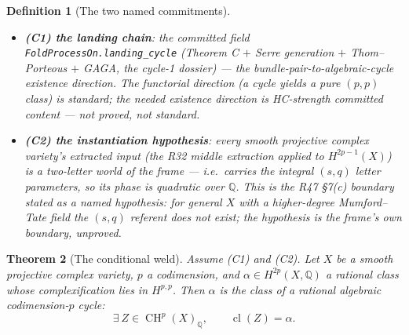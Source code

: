 \documentclass[11pt]{article}
\newcommand{\Q}{\mathbb Q}
\newcommand{\Cl}{\operatorname{cl}}
\newcommand{\CH}{\operatorname{CH}}
\newtheorem{theorem}{Theorem}[section]
\newtheorem{definition}[theorem]{Definition}
\begin{document}
\begin{definition}[The two named commitments]\label{def:commit}
\quad
\begin{itemize}
\item \textbf{(C1) the landing chain}: the committed field
\texttt{FoldProcessOn.landing\_cycle} (Theorem C $+$ Serre generation
$+$ Thom--Porteous $+$ GAGA, the cycle-1 dossier) --- the
bundle-pair-to-algebraic-cycle \emph{existence} direction. The
functorial direction (a cycle yields a pure $(p,p)$ class) is
standard; the needed existence direction is HC-strength committed
content --- not proved, not standard.
\item \textbf{(C2) the instantiation hypothesis}: every smooth
projective complex variety's extracted input (the R32 middle
extraction applied to $H^{2p-1}(X)$) is a two-letter world of the
frame --- i.e.\ carries the integral $(s,q)$ letter parameters, so
its phase is quadratic over $\Q$. This is the R47 \S7(c) boundary
stated as a named hypothesis: for general $X$ with a higher-degree
Mumford--Tate field the $(s,q)$ referent does not exist; the
hypothesis is the frame's own boundary, unproved.
\end{itemize}
\end{definition}

\begin{theorem}[The conditional weld]\label{thm:weld}
Assume (C1) and (C2). Let $X$ be a smooth projective complex variety,
$p$ a codimension,
and $\alpha\in H^{2p}(X,\Q)$ a rational class whose complexification
lies in $H^{p,p}$. Then $\alpha$ is the class of a rational algebraic
codimension-$p$ cycle:
\[
\exists\ Z\in\CH^p(X)_\Q,\qquad \Cl(Z)=\alpha .
\]
\end{theorem}
\end{document}

